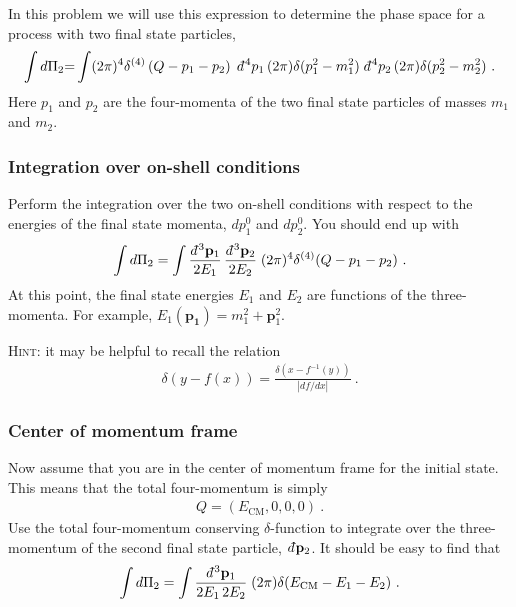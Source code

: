 \documentclass[12pt]{article}
\renewcommand{\vec}[1]{\mathbf{#1}} %
\newcommand{\dbar}{d\mkern-6mu\mathchar'26\hspace{-.1em}}    %
\begin{document}
In this problem we will use this expression to determine the phase space for a process with two final state particles,
\begin{align}
	\int d\Pi_2 {=} 
	\int (2\pi)^4 \delta^{(4)}\left(Q-p_1-p_2\right) 
	\;
	\dbar^4 p_1\, (2\pi)\delta(p_1^2 - m_1^2) 
	\;
	\dbar^4 p_2\, (2\pi)\delta(p_2^2 - m_2^2)
	\ .
\end{align}
Here $p_1$ and $p_2$ are the four-momenta of the two final state particles of masses $m_1$ and $m_2$.

\subsubsection{Integration over on-shell conditions}

Perform the integration over the two on-shell conditions with respect to the energies of the final state momenta, $dp_1^0$ and $dp_2^0$.  You should end up with
\begin{align}
	\int d\Pi_2 = 
	\int \frac{\dbar^3 \vec{p}_1}{2E_1} \, \frac{\dbar^3 \vec{p}_2}{2E_2}
	\;
	(2\pi)^4 \delta^{(4)}(Q-p_1-p_2) \ .
\end{align}
At this point, the final state energies $E_1$ and $E_2$ are functions of the three-momenta. For example, $E_1(\vec{p_1}) = m_1^2 + \vec{p}_1^2$.


\textsc{Hint:} it may be helpful to recall the relation
\begin{align}
	\delta(y-f(x)) = \frac{\delta(x-f^{-1}(y))}{|df/dx|} \ .
\end{align}

\subsubsection{Center of momentum frame}

Now assume that you are in the center of momentum frame for the initial state. This means that the total four-momentum is simply
\begin{align}
	Q = \left(E_\text{CM}, 0, 0, 0\right) \ .
\end{align}
Use the total four-momentum conserving $\delta$-function to integrate over the three-momentum of the second final state particle, $\dbar \vec{p}_2$. It should be easy to find that
\begin{align}
	\int d\Pi_2 = \int \frac{\dbar^3\vec{p}_1}{2E_1\, 2E_2} \;
	(2\pi)\delta(E_\text{CM} - E_1 - E_2) \ .
\end{align}
\end{document}
